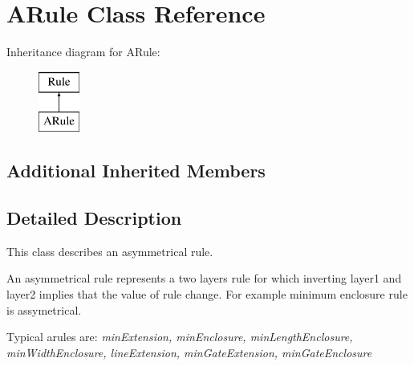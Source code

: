 \hypertarget{class_d_t_r_1_1_a_rule}{}\section{A\+Rule Class Reference}
\label{class_d_t_r_1_1_a_rule}
Inheritance diagram for A\+Rule\+:\begin{figure}[H]
\begin{center}
\leavevmode
\includegraphics[height=2.000000cm]{class_d_t_r_1_1_a_rule}
\end{center}
\end{figure}
\subsection*{Additional Inherited Members}


\subsection{Detailed Description}
This class describes an asymmetrical rule.

An asymmetrical rule represents a two layers rule for which inverting layer1 and layer2 implies that the value of rule change. For example minimum enclosure rule is assymetrical.

Typical arules are\+: {\itshape min\+Extension, min\+Enclosure, min\+Length\+Enclosure, min\+Width\+Enclosure, line\+Extension, min\+Gate\+Extension, min\+Gate\+Enclosure} 